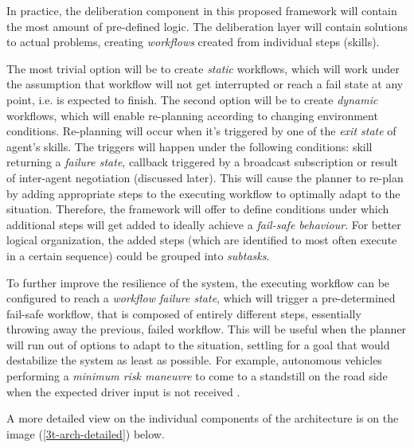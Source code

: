 \documentclass[main.tex]{subfiles}
\begin{document}
In practice, the deliberation component in this proposed framework will contain the most amount
of pre-defined logic.  The deliberation layer will contain solutions to actual problems,
creating \emph{workflows} created from individual steps (skills).

The most trivial option will be to create \emph{static} workflows, which will work under the
assumption that workflow will not get interrupted or reach a fail state at any point, i.e. is
expected to finish. The second option will be to create \emph{dynamic} workflows, which will enable
re-planning according to changing environment conditions.  Re-planning will occur when it's
triggered by one of the \emph{exit state} of agent's skills. The triggers will happen under the
following conditions: skill returning a \emph{failure state}, callback triggered by a broadcast
subscription or result of inter-agent negotiation (discussed later). This will cause the
planner to re-plan by adding appropriate steps to the executing workflow to optimally adapt to
the situation. Therefore, the framework will offer to define conditions under which additional
steps will get added to ideally achieve a \emph{fail-safe behaviour}. For better logical
organization, the added steps (which are identified to most often execute in a certain
sequence) could be grouped into \emph{subtasks}.

To further improve the resilience of the
system, the executing workflow can be configured to reach a \emph{workflow failure state},
which will trigger a pre-determined fail-safe workflow, that is composed of entirely different
steps, essentially throwing away the previous, failed workflow.  This will be useful when the
planner will run out of options to adapt to the situation, settling for a goal that would
destabilize the system as least as possible. For example, autonomous vehicles performing a
\emph{minimum risk maneuvre} to come to a standstill on the road side when the expected driver
input is not received \cite{WorkingAutonomous2022}.

A more detailed view on the individual components of the architecture is on the image (\ref{3t-arch-detailed}) below.
\end{document}
